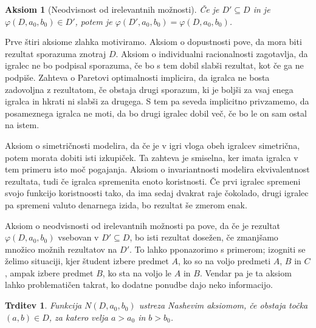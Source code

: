 \documentclass[10pt, a4paper]{article}
\newtheorem{trditev}[izr]{Trditev}
\newtheorem{aksiom}{Aksiom}[section]
\begin{document}
\begin{aksiom}[Neodvisnost od irelevantnih možnosti]
  Če je $D' \subseteq D$ in je $\varphi(D, a_0, b_0) \in D'$,
  potem je $\varphi(D', a_0, b_0) = \varphi(D, a_0, b_0)$.
\end{aksiom}

Prve štiri aksiome zlahka motiviramo.
Aksiom o dopustnosti pove, da mora biti rezultat sporazuma znotraj $D$.
Aksiom o individualni racionalnosti zagotavlja, da igralec ne bo podpisal sporazuma,
če bo s tem dobil slabši rezultat, kot če ga ne podpiše.
Zahteva o Paretovi optimalnosti implicira, da igralca ne bosta zadovoljna z rezultatom,
če obstaja drugi sporazum, ki je boljši za vsaj enega igralca in hkrati ni slabši za drugega.
S tem pa seveda implicitno privzamemo, da posameznega igralca ne moti, da bo drugi igralec dobil več,
če bo le on sam ostal na istem.

Aksiom o simetričnosti modelira, da če je v igri vloga obeh igralcev simetrična, potem morata dobiti isti izkupiček.
Ta zahteva je smiselna, ker imata igralca v tem primeru isto moč pogajanja.
Aksiom o invariantnosti modelira ekvivalentnost rezultata, tudi če igralca spremenita enoto koristnosti.
Če prvi igralec spremeni svojo funkcijo koristnoosti tako, da ima sedaj dvakrat raje čokolado,
drugi igralec pa spremeni valuto denarnega izida, bo rezultat še zmerom enak.

Aksiom o neodvisnosti od irelevantnih možnosti pa pove, da če je rezultat $\varphi(D, a_0, b_0)$
vsebovan v $D' \subseteq D$, bo isti rezultat dosežen,
če zmanjšamo množico možnih rezultatov na $D'$.
To lahko pponazorimo s primerom; izogniti se želimo situaciji, kjer študent izbere predmet $A$,
ko so na voljo predmeti $A$, $B$ in $C$, ampak izbere predmet $B$,
ko sta na voljo le $A$ in $B$. Vendar pa je ta aksiom lahko problematičen takrat,
ko dodatne ponudbe dajo neko informacijo. 

\begin{trditev}
  Funkcija $N(D, a_0, b_0)$ ustreza Nashevim aksiomom, če obstaja točka $(a, b) \in D$,
  za katero velja $a > a_0$ in $b > b_0$.
\end{trditev}
\end{document}

